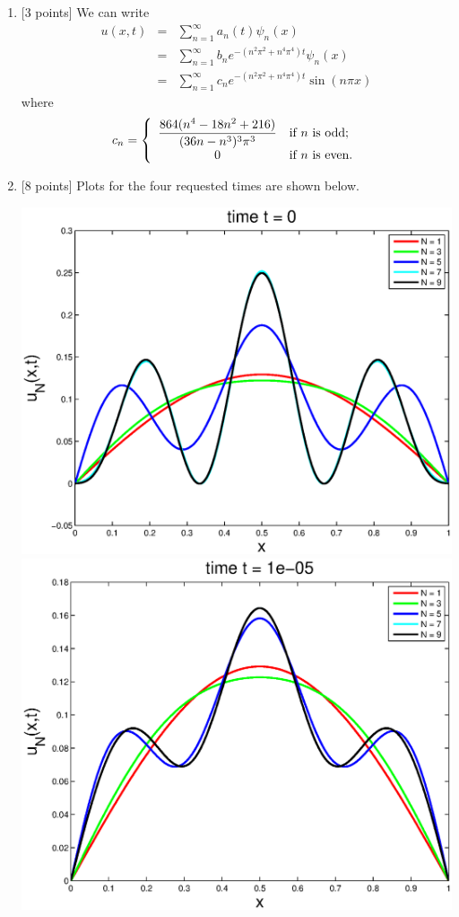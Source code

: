 \begin{solution}
\begin{enumerate}
\item {[3 points]} We can write
\begin{eqnarray*}
u(x,t) &=& \sum_{n=1}^\infty a_n(t) \psi_n(x)
\\
&=& \sum_{n=1}^\infty b_n e^{-(n^2\pi^2 + n^4\pi^4)t} \psi_n(x)
\\
&=& \sum_{n=1}^\infty c_n e^{-(n^2\pi^2 + n^4\pi^4)t} \sin(n\pi x)
\end{eqnarray*}
where
\[
c_n=\left\{ \begin{array}{cl} \displaystyle{{864 (n^4-18n^2 + 216) \over (36n-n^3)^3 \pi^3}} & \mbox{if }n\mbox{ is odd}; \\0 & \mbox{if }n\mbox{ is even}.\end{array}\right.
\]

\item {[8 points]} Plots for the four requested times are shown below.
\begin{center}
\includegraphics[scale=0.4]{fourth_a}
\includegraphics[scale=0.4]{fourth_b}


\end{center}
\end{enumerate}
\end{solution}
